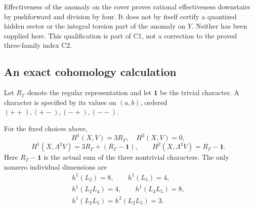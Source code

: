 Effectiveness of the anomaly on the cover proves rational effectiveness
downstairs by pushforward and division by four. It does not by itself
certify a quantized hidden sector or the integral torsion part of the
anomaly on $Y$. Neither has been supplied here. This qualification is
part of C1, not a correction to the proved three-family index C2.

\subsection{An exact cohomology calculation}
Let $R_\Gamma$ denote the regular representation and let $\mathbf1$
be the trivial character. A character is specified by its values on
$(a,b)$, ordered $(++),(+-),(-+),(--)$.

\begin{theorem}\label{thm:fixedcohom}
For the fixed choices above,
\[
 H^1(X,V)=3R_\Gamma,\quad H^2(X,V)=0,
\]
\[
 H^1(X,\Lambda^2V)=3R_\Gamma+(R_\Gamma-\mathbf1),\qquad
 H^2(X,\Lambda^2V)=R_\Gamma-\mathbf1.
\]
Here $R_\Gamma-\mathbf1$ is the actual sum of the three nontrivial
characters. The only nonzero individual dimensions are
\begin{gather*}
 h^1(L_2)=8,\qquad h^1(L_5)=4,\\
 h^1(L_2L_4)=4,\qquad h^1(L_4L_5)=8,\\
 h^1(L_2L_5)=h^2(L_2L_5)=3.
\end{gather*}
\end{theorem}
